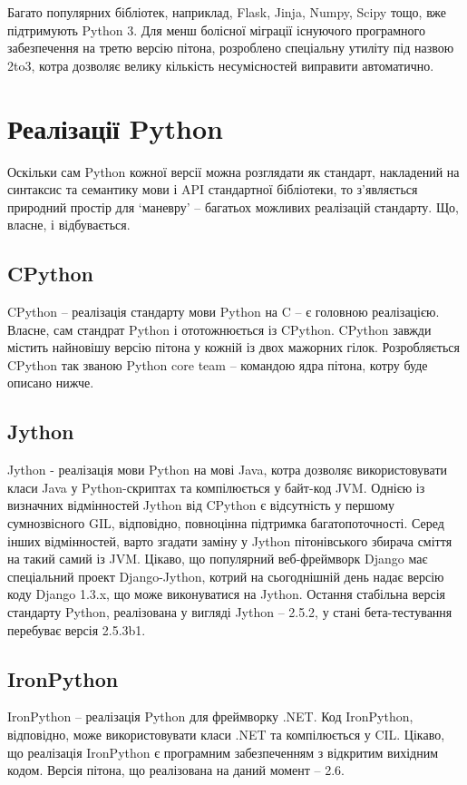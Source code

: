 \documentclass[a4paper, 12pt, onsedie]{article}
\begin{document}
Багато популярних бібліотек, наприклад, Flask, Jinja, Numpy, Scipy тощо, вже підтримують
Python 3. Для менш болісної міграції існуючого програмного забезпечення на третю версію
пітона, розроблено спеціальну утиліту під назвою 2to3, котра дозволяє велику кількість
несумісностей виправити автоматично.

\section{Реалізації Python}
Оскільки сам Python кожної версії можна розглядати як стандарт, накладений на синтаксис та
семантику мови і API стандартної бібліотеки, то з'являється природний простір для `маневру'
 -- багатьох можливих реалізацій стандарту. Що, власне, і відбувається.

\subsection{CPython}
CPython -- реалізація стандарту мови Python на C -- є головною реалізацією. Власне, сам
стандрат Python і ототожнюється із CPython. CPython завжди містить найновішу версію пітона 
у кожній із двох мажорних гілок. Розробляється CPython так званою Python core team -- 
командою ядра пітона, котру буде описано нижче.


\subsection{Jython}
Jython - реалізація мови Python на мові Java, котра дозволяє використовувати класи Java у 
Python-скриптах та компілюється у байт-код JVM. Однією із визначних відмінностей Jython від
CPython є відсутність у першому сумнозвісного GIL, відповідно, повноцінна підтримка 
багатопоточності. Серед інших відмінностей, варто згадати заміну у Jython пітонівського 
збирача сміття на такий самий із JVM.
Цікаво, що популярний веб-фреймворк Django має спеціальний проект Django-Jython, котрий на
сьогоднішній день надає версію коду Django 1.3.x, що може виконуватися на Jython.
Остання стабільна версія стандарту Python, реалізована у вигляді Jython -- 2.5.2, у стані 
бета-тестування перебуває версія 2.5.3b1.

\subsection{IronPython}
IronPython -- реалізація Python для фреймворку .NET. Код IronPython, відповідно, може 
використовувати класи .NET та компілюється у CIL. Цікаво, що реалізація IronPython є 
програмним забезпеченням з відкритим вихідним кодом. Версія пітона, що реалізована на даний 
момент -- 2.6.
\end{document}
